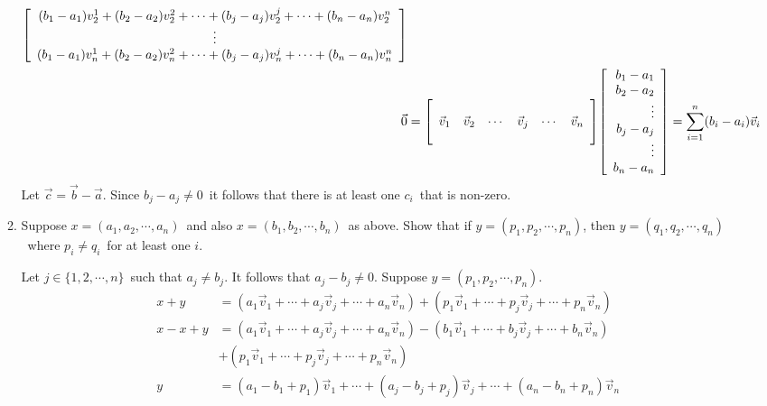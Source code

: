 \documentclass{letter}
\newcommand{\Vn}[1]{\vec{#1}}
\newcommand{\?}{\stackrel{?}{=}}
\newcommand\Que[1]{%
   \leavevmode\noindent
   #1
}
\newcommand\Ans[2][]{%
   \leavevmode\noindent
   {
       \begin{mdframed}[backgroundcolor=blue!10]
       #2
       \end{mdframed}
   }
}
\newenvironment{Mat}[1]{%
  \left[\begin{array}{*{#1}{r}}
}{%
  \end{array}\right]
}
\newenvironment{Cmat}[1]{%
  \left[\begin{array}{*{#1}{c}}
}{%
  \end{array}\right]
}
\begin{document}
\begin{enumerate}
\begin{enumerate}[label=(\alph*)]
{\begin{align*}
\begin{Cmat}{1}
                                        (b_1-a_1)v_2^1+(b_2-a_2)v_2^2+\cdots+(b_j-a_j)v_2^j+\cdots+(b_n-a_n)v_2^n \\
                                        \vdots \\
                                        (b_1-a_1)v_n^1+(b_2-a_2)v_n^2+\cdots+(b_j-a_j)v_n^j+\cdots+(b_n-a_n)v_n^n \end{Cmat} \\
              \Vn{0} &=\begin{Mat}{6}          &          &        &          &        & \\
                                      \Vn{v}_1 & \Vn{v}_2 & \cdots & \Vn{v}_j & \cdots & \Vn{v}_n \\ 
                                               &          &        &          &        & \end{Mat}
              \begin{Mat}{1} b_1-a_1 \\ b_2-a_2 \\ \vdots \\ b_j-a_j \\ \vdots \\ b_n-a_n \end{Mat}   
              = \sum^n_{i=1} (b_i-a_i)\Vn{v}_i                 
          \end{align*}
          Let $\Vn{c}=\Vn{b}-\Vn{a}$.  Since $b_j-a_j \not = 0$\ it follows that there is at least one $c_i$\ that is non-zero.
      }      
      ~\\
      \item \Que {
      Suppose $x=(a_1,a_2,\cdots,a_n)$\ and also $x=(b_1,b_2,\cdots,b_n)$\ as above.  Show that if $y=(p_1,p_2,\cdots,p_n)$, then $y=(q_1,q_2,\cdots,q_n)$\ where $p_i\not = q_i$\ for at least one $i$.   
      }
      \Ans{
      Let $j\in \{1,2,\cdots,n\}$\ such that $a_j\not = b_j$.  It follows that $a_j-b_j\not = 0$.  Suppose $y=(p_1,p_2,\cdots,p_n)$.
      \begin{align*}
          x+y&=(a_1\Vn{v}_1 + \cdots + a_j\Vn{v}_j+\cdots+a_n\Vn{v}_n) + (p_1\Vn{v}_1 + \cdots + p_j\Vn{v}_j+\cdots+p_n\Vn{v}_n)\\
          x-x+y &=(a_1\Vn{v}_1 + \cdots + a_j\Vn{v}_j+\cdots+a_n\Vn{v}_n) - (b_1\Vn{v}_1 + \cdots + b_j\Vn{v}_j+\cdots+b_n\Vn{v}_n)\\
                &+ (p_1\Vn{v}_1 + \cdots + p_j\Vn{v}_j+\cdots+p_n\Vn{v}_n)\\
          y &= (a_1-b_1+p_1)\Vn{v}_1+\cdots+(a_j-b_j+p_j)\Vn{v}_j+\cdots+(a_n-b_n+p_n)\Vn{v}_n

\end{align*}}
\end{enumerate}
\end{enumerate}
\end{document}
